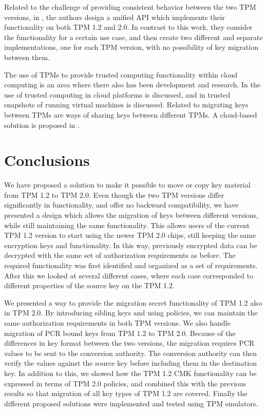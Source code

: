 {Related to the challenge of providing consistent behavior between the two TPM versions, in \cite{hell:2014}, the authors design a unified API which implements their functionality on both TPM 1.2 and 2.0. In contrast to this work, they consider the functionality for a certain use case, and then create two different and separate implementations, one for each TPM version, with no possibility of key migration between them.

The use of TPMs to provide trusted computing functionality within cloud computing is an area where there also has been development and research. In \cite{santos:2009} the use of trusted computing in cloud platforms is discussed, and in \cite{srivastava:2012} trusted snapshots of running virtual machines is discussed. Related to migrating keys between TPMs are ways of sharing keys between different TPMs. A cloud-based solution is proposed in \cite{chen:2014}.

\section{Conclusions} \label{sec:discussion}
We have proposed a solution to make it possible to move or copy key material from TPM 1.2 to TPM 2.0. Even though the two TPM versions differ significantly in functionality, and offer no backward compatibility, we have presented a design which allows the migration of keys between different versions, while still maintaining the same functionality.
This allows users of the current TPM 1.2 version to start using the newer TPM 2.0 chips, still keeping the same encryption keys and functionality. In this way, previously encrypted data can be decrypted with the same set of authorization requirements as before.
The required functionality was first identified and organized as a set of requirements. After this we looked at several different cases, where each case corresponded to different properties of the source key on the TPM 1.2.

We presented a way to provide the migration secret functionality of TPM 1.2 also in TPM 2.0. By introducing sibling keys and using policies, we can maintain the same authorization requirements in both TPM versions.
We also handle migration of PCR bound keys from TPM 1.2 to TPM 2.0. Because of the differences in key format between the two versions, the migration requires PCR values to be sent to the conversion authority. The conversion authority can then verify the values against the source key before including them in the destination key.
In addition to this, we showed how the TPM 1.2 CMK functionality can be expressed in terms of TPM 2.0 policies, and combined this with the previous results so that migration of all key types of TPM 1.2 are covered.
Finally the different proposed solutions were implemented and tested using TPM emulators.

}
